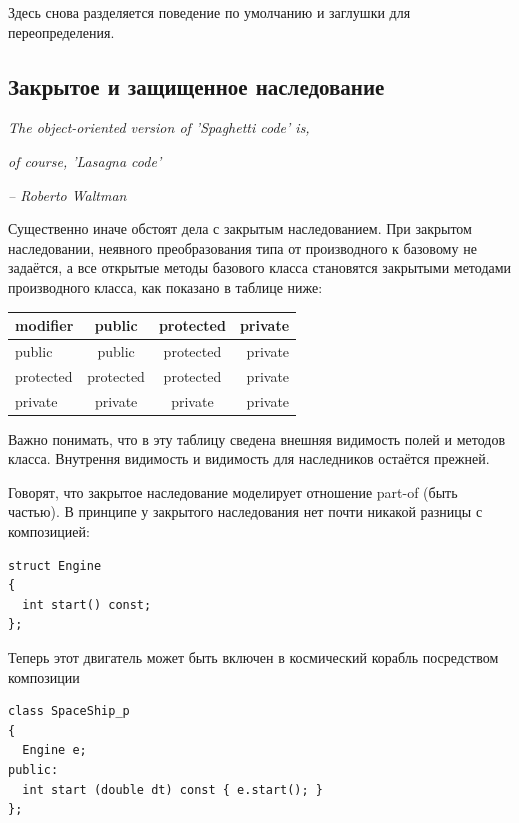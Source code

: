 \documentclass[a4paper,12pt,oneside]{book}
\begin{document}
Здесь снова разделяется поведение по умолчанию и заглушки для переопределения.

\subsection{Закрытое и защищенное наследование}\label{OtherInheritance}

\hfill\textit{The object-oriented version of 'Spaghetti code' is,}

\hfill\textit{of course, 'Lasagna code'}{\vspace{0.5em}}

\hfill\textit{-- Roberto Waltman}

Существенно иначе обстоят дела с закрытым наследованием. При закрытом наследовании, неявного преобразования типа от производного к базовому не задаётся, а все открытые методы базового класса становятся закрытыми методами производного класса, как показано в таблице ниже:

\begin{center}
  \begin{tabular}{ | l | c | c | r | }
    \hline
    modifier & public & protected & private \\ \hline \hline
    public & public & protected & private \\ \hline
    protected & protected & protected & private \\ \hline
    private & private & private & private \\ \hline
  \end{tabular}
\end{center}

Важно понимать, что в эту таблицу сведена внешняя видимость полей и методов класса. Внутрення видимость и видимость для наследников остаётся прежней.

Говорят, что закрытое наследование моделирует отношение part-of (быть частью). В принципе у закрытого наследования нет почти никакой разницы с композицией:

\begin{lstlisting}
struct Engine
{
  int start() const;
};
\end{lstlisting}

Теперь этот двигатель может быть включен в космический корабль посредством композиции

\begin{lstlisting}
class SpaceShip_p
{
  Engine e;
public:
  int start (double dt) const { e.start(); } 
};
\end{lstlisting}
\end{document}
